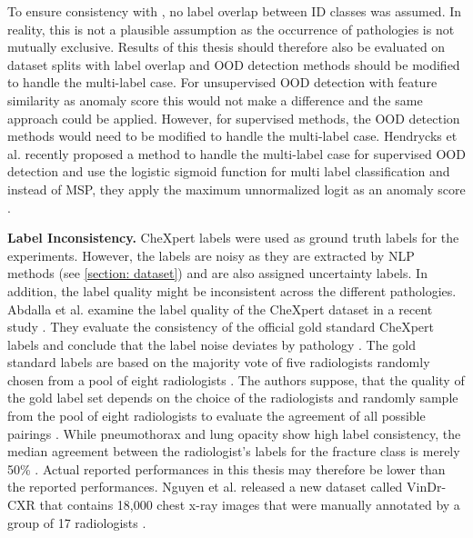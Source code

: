 To ensure consistency with \citep{Berger2021}, no label overlap between ID classes was assumed. 
In reality, this is not a plausible assumption as the occurrence of pathologies is not mutually exclusive.
Results of this thesis should therefore also be evaluated on dataset splits with label overlap and OOD detection methods should be modified to handle the multi-label case.
For unsupervised OOD detection with feature similarity as anomaly score this would not make a difference and the same approach could be applied.
However, for supervised methods, the OOD detection methods would need to be modified to handle the multi-label case.
Hendrycks et al. recently proposed a method to handle the multi-label case for supervised OOD detection and use the logistic sigmoid function for multi label classification and instead of MSP, they apply the maximum unnormalized logit as an anomaly score \citep{Hendrycks2022}.
\par
\textbf{Label Inconsistency.}
CheXpert labels were used as ground truth labels for the experiments.
However, the labels are noisy as they are extracted by NLP methods (see \ref{section: dataset}) and are also assigned uncertainty labels.
In addition, the label quality might be inconsistent across the different pathologies.
Abdalla et al. examine the label quality of the CheXpert dataset in a recent study \citep{Abdalla2023}.
They evaluate the consistency of the official gold standard CheXpert labels and conclude that the label noise deviates by pathology \citep{Abdalla2023}.
The gold standard labels are based on the majority vote of five radiologists randomly chosen from a pool of eight radiologists \citep{Irvin2019}.
The authors suppose, that the quality of the gold label set depends on the choice of the radiologists and randomly sample from the pool of eight radiologists to evaluate the agreement of all possible pairings \citep{Abdalla2023}. 
While pneumothorax and lung opacity show high label consistency, the median agreement between the radiologist's labels for the fracture class is merely 50\% \citep{Abdalla2023}.
Actual reported performances in this thesis may therefore be lower than the reported performances.
Nguyen et al. released a new dataset called VinDr-CXR that contains 18,000 chest x-ray images that were manually annotated by a group of 17 radiologists \citep{Nguyen2022}.
